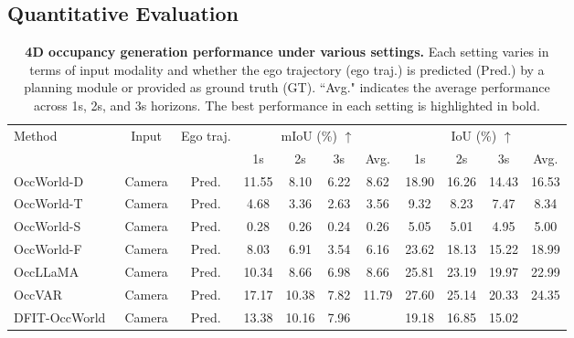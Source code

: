 \subsection{Quantitative Evaluation}\label{sec:exp_quant}

\begin{table}[t]
    \newcommand{\graycell}{\cellcolor{gray!30}}
    \setlength{\tabcolsep}{0.006\linewidth}
    \caption{
        \textbf{4D occupancy generation performance under various settings.}
        Each setting varies in terms of input modality and whether the ego trajectory (ego traj.) is predicted (Pred.) by a planning module or provided as ground truth (GT). 
        ``Avg." indicates the average performance across 1s, 2s, and 3s horizons. The best performance in each setting is highlighted in bold.
    }\label{tab:compare_sota}
    \centering
    \small
    \begin{tabular}{l|cc|cccc|cccc}
        \toprule            
        \multirow{2}{*}{Method} & \multirow{2}{*}{Input} & \multirow{2}{*}{Ego traj.} &
        \multicolumn{4}{c|}{mIoU (\%) $\uparrow$} & 
        \multicolumn{4}{c}{IoU (\%) $\uparrow$} \\
         & & & 1s & 2s & 3s & \graycell  Avg. & 1s & 2s & 3s & \graycell Avg. \\
        \midrule
        OccWorld-D~\cite{occworld} &  Camera & Pred. & 11.55 & 8.10 & 6.22 & \graycell 8.62  & 18.90 & 16.26 & 14.43 & \graycell 16.53 \\
        OccWorld-T~\cite{occworld} &  Camera & Pred.  & 4.68 & 3.36 & 2.63 & \graycell 3.56 & 9.32 & 8.23 & 7.47 & \graycell 8.34 \\
        OccWorld-S~\cite{occworld} &  Camera & Pred. & 0.28 & 0.26 & 0.24 & \graycell 0.26  & 5.05 & 5.01 & 4.95 & \graycell 5.00 \\
        OccWorld-F~\cite{occworld} &  Camera & Pred.  &  8.03  & 6.91   &  3.54  &  \graycell 6.16  &     23.62   &  18.13  &  15.22  &  \graycell 18.99    \\
        OccLLaMA~\cite{occllama} &  Camera & Pred. &  10.34  &  8.66  &  6.98  &  \graycell  8.66     &  25.81  &  23.19  &   19.97 &  \graycell  22.99  \\
        OccVAR~\cite{occvar} &  Camera & Pred. &    17.17 &10.38 &7.82 &\graycell 11.79 & 27.60 &25.14 &20.33 & \graycell 24.35  \\
        DFIT-OccWorld~\cite{dfit-occworld} &  Camera & Pred. & 13.38 & 10.16 & 7.96 & \graycell{10.50}  & 19.18 & 16.85 & 15.02 & \graycell{17.02} \\

\end{tabular}
\end{table}
